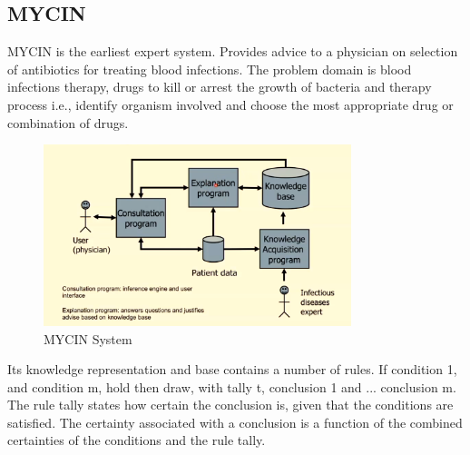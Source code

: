 \documentclass[a4paper]{article}
\theoremstyle{plain}
\theoremstyle{definition}
\theoremstyle{remark}
\begin{document}
\subsection{MYCIN}
MYCIN is the earliest expert system. Provides advice to a physician on selection of antibiotics for treating blood infections. The problem domain is blood infections therapy, drugs to kill or arrest the growth of bacteria and therapy process i.e., identify organism involved and choose the most appropriate drug or combination of drugs.
\begin{figure}[H]
	\centering
	\includegraphics[width=0.8\textwidth]{mycin.png}
	\caption{MYCIN System}
	\label{fig:mycin-png}
\end{figure}
Its knowledge representation and base contains a number of rules. If condition 1, and condition m, hold then draw, with tally t, conclusion 1 and ... conclusion m. The rule tally states how certain the conclusion is, given that the conditions are satisfied. The certainty associated with a conclusion is a function of the combined certainties of the conditions and the rule tally. 
\end{document}
